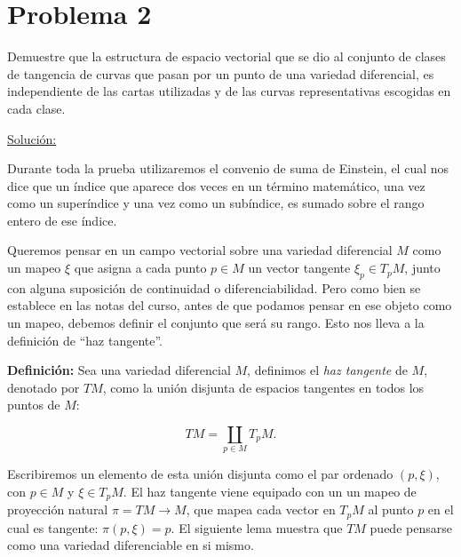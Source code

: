 \documentclass[a4paper,10pt]{article}
\numberwithin{equation}{section}
\newcommand{\definicion}{\textbf{Definición: }}
\begin{document}
\section{Problema 2}

Demuestre que la estructura de espacio vectorial que se dio al conjunto de clases de 
tangencia de curvas que pasan por un punto de una variedad diferencial, es independiente 
de las cartas utilizadas y de las curvas representativas escogidas en cada clase.

\vspace{.3cm}

\underline{Solución:} \vspace{.3cm}

Durante toda la prueba utilizaremos el convenio de suma de Einstein, el cual nos dice 
que un índice que aparece dos veces en un término matemático, una vez como un 
superíndice y una vez como un subíndice, es sumado sobre el rango entero de ese 
índice. 

\vspace{.3cm}

Queremos pensar en un campo vectorial sobre una variedad diferencial $M$ como un 
mapeo $\xi$ que asigna a cada punto $p \in M$ un vector tangente $\xi_p \in T_p M$, 
junto con alguna suposición de continuidad o diferenciabilidad. Pero como bien 
se establece en las notas del curso, antes de que podamos pensar en ese objeto 
como un mapeo, debemos definir el conjunto que será su rango. Esto nos lleva a la 
definición de ``haz tangente''.

\vspace{.3cm}

\definicion Sea una variedad diferencial $M$, definimos el \emph{haz tangente} de 
$M$, denotado por $TM$, como la unión disjunta de espacios tangentes en todos 
los puntos de $M$:

\begin{equation}
 TM = \underset{p \in M}{\coprod} T_p M.
\end{equation}

Escribiremos un elemento de esta unión disjunta como el par ordenado $(p,\xi)$, 
con $p \in M$ y $\xi \in T_pM$. El haz tangente viene equipado con un un mapeo 
de proyección natural $\pi = TM \rightarrow M$, que mapea cada vector en $T_p M$ 
al punto $p$ en el cual es tangente: $\pi(p,\xi) = p$. El siguiente lema 
muestra que $TM$ puede pensarse como una variedad diferenciable en si mismo.

\vspace{.3cm}
\end{document}
